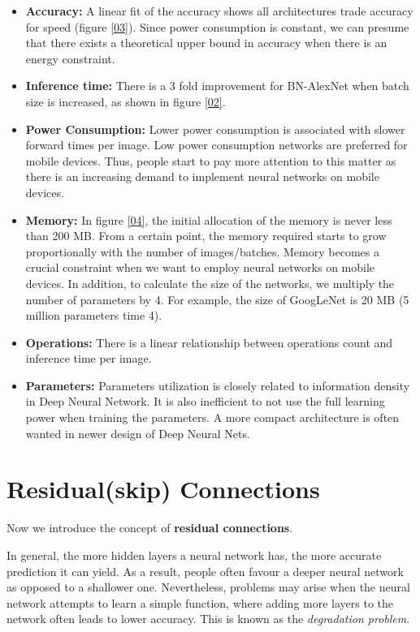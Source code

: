 \begin{itemize}
    \item \textbf{Accuracy:} A linear fit of the accuracy shows all architectures trade accuracy for speed (figure \ref{03}). Since power consumption is constant, we can presume that there exists a theoretical upper bound in accuracy when there is an energy constraint.
    \item \textbf{Inference time:} There is a 3 fold improvement for BN-AlexNet when batch size is increased, as shown in figure \ref{02}. 
    \item \textbf{Power Consumption:} Lower power consumption is associated with slower forward times per image. Low power consumption networks are preferred for mobile devices. Thus, people start to pay more attention to this matter as there is an increasing demand to implement neural networks on mobile devices.
    \item \textbf{Memory:} In figure \ref{04}, the initial allocation of the memory is never less than 200 MB. From a certain point, the memory required starts to grow proportionally with the number of images/batches. Memory becomes a crucial constraint when we want to employ neural networks on mobile devices. In addition, to calculate the size of the networks, we multiply the number of parameters by 4. For example, the size of GoogLeNet is 20 MB (5 million parameters time 4).
    \item \textbf{Operations:} There is a linear relationship between operations count and inference time per image.
    \item \textbf{Parameters:} Parameters utilization is closely related to information density in Deep Neural Network. It is also inefficient to not use the full learning power when training the parameters. A more compact architecture is often wanted in newer design of Deep Neural Nets. 
\end{itemize}
\section{Residual(skip) Connections}

Now we introduce the concept of \textbf{residual connections}.

In general, the more hidden layers a neural network has, the more accurate prediction it can yield. As a result, people often favour a deeper neural network as opposed to a shallower one. Nevertheless, problems may arise when the neural network attempts to learn a simple function, where adding more layers to the network often leads to lower accuracy. This is known as the \textit{degradation problem}.

